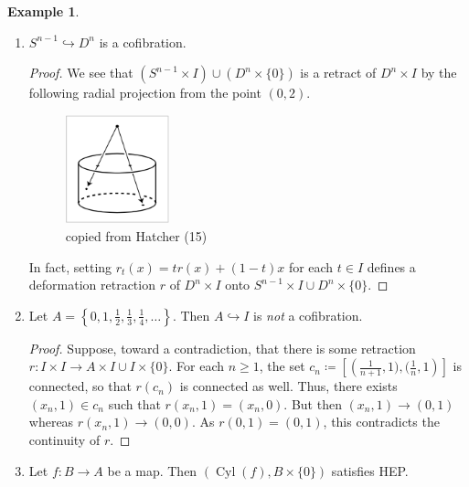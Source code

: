 \documentclass[10pt,letterpaper,cm]{nupset}
\theoremstyle{definition}
\newtheorem{exmp}[definition]{Example}
\theoremstyle{theorem}
\theoremstyle{remark}
\newcommand{\1}{\mathbb{1}}
\newcommand{\0}{\vec 0}
\DeclareMathOperator{\cyl}{Cyl}
\begin{document}
\begin{exmp}\label{ex12} $ $
\begin{enumerate}[label=(\alph*)]
\item $S^{n-1} \hookrightarrow D^n$ is a cofibration. 
\begin{proof}
We see that $\left(S^{n-1} \times I\right) \cup \left(D^n \times \{0\}\right)$ is a retract of $D^n \times I$ by the following radial projection from the point $(0,2)$.
\begin{figure}[H]
\centering
\includegraphics[width=30mm]{Hatcher-radial_proj.png}
\caption{copied from Hatcher (15) \label{overflow}}
\end{figure} In fact, setting $r_t(x) = tr(x) +(1-t)x$ for each $t\in I$ defines a deformation retraction $r$ of $D^n \times I$ onto $S^{n-1} \times I \cup D^n \times \{0\}$.
\end{proof}
\item Let $A= \left\{0, 1, \frac{1}{2}, \frac{1}{3}, \frac{1}{4}, \ldots\right\}$. Then $A \hookrightarrow I$ is \emph{not} a cofibration.
\begin{proof}
Suppose, toward a contradiction, that there is some retraction $r: I \times I \to A \times I \cup I \times \{0\}$. For each $n\geq 1$, the set $c_n \coloneqq  \left[\left(\frac{1}{n+1}, 1), (\frac{1}{n}, 1\right)\right]$ is connected, so that $r(c_n)$ is connected as well. Thus, there exists $(x_n, 1) \in c_n$ such that $r(x_n, 1) = (x_n ,0)$. But then $(x_n, 1) \to (0, 1)$ whereas $r(x_n, 1) \to (0, 0)$. As $r(0,1) = (0,1)$, this contradicts the continuity of $r$. 
\end{proof}
\item Let $f: B \to A$ be a map. Then $\left(\cyl(f), B \times \{0\}\right)$ satisfies HEP.
\end{enumerate}
\end{exmp}
\end{document}
